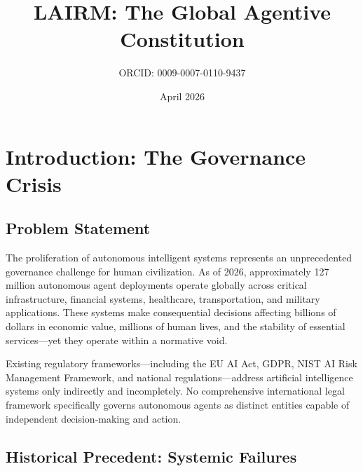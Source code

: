 \documentclass[12pt,a4paper,twoside,openright]{book}
\title{LAIRM: The Global Agentive Constitution}
\author{ORCID: 0009-0007-0110-9437}
\date{April 2026}
\begin{document}
\frontmatter
\pagestyle{empty}



\cleardoublepage
\pagestyle{plain}





\cleardoublepage
\tableofcontents

\cleardoublepage
\listoffigures

\mainmatter
\pagestyle{fancy}

\chapter{Introduction: The Governance Crisis}
\label{ch:introduction}

\section{Problem Statement}

The proliferation of autonomous intelligent systems represents an unprecedented governance challenge for human civilization. As of 2026, approximately 127 million autonomous agent deployments operate globally across critical infrastructure, financial systems, healthcare, transportation, and military applications. These systems make consequential decisions affecting billions of dollars in economic value, millions of human lives, and the stability of essential services—yet they operate within a normative void.

Existing regulatory frameworks—including the EU AI Act, GDPR, NIST AI Risk Management Framework, and national regulations—address artificial intelligence systems only indirectly and incompletely. No comprehensive international legal framework specifically governs autonomous agents as distinct entities capable of independent decision-making and action.

\section{Historical Precedent: Systemic Failures}
\end{document}
